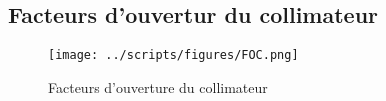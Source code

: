 \documentclass{article}
\begin{document}
\newpage
\subsection{Facteurs d'ouvertur du collimateur}

\begin{figure}[h]
  \centering
  \texttt{[image: ../scripts/figures/FOC.png]}
  \caption{Facteurs d'ouverture du collimateur}
  \label{fig_foc}
\end{figure}

\clearpage


\nocite{*}
\end{document}
